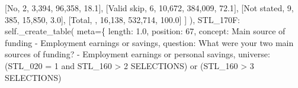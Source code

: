 \documentclass[
  11pt,
  a4paper,
]{article}
\newenvironment{Shaded}{\begin{snugshade}}{\end{snugshade}}
\newcommand{\NormalTok}[1]{\textcolor[rgb]{0.00,0.23,0.31}{#1}}
\newcommand{\OperatorTok}[1]{\textcolor[rgb]{0.37,0.37,0.37}{#1}}
\newcommand{\StringTok}[1]{\textcolor[rgb]{0.13,0.47,0.30}{#1}}
\newcommand{\VariableTok}[1]{\textcolor[rgb]{0.07,0.07,0.07}{#1}}
\begin{document}
\begin{Shaded}
\begin{Highlighting}[]
\NormalTok{                    [}\StringTok{\textquotesingle{}No\textquotesingle{}}\NormalTok{, }\StringTok{\textquotesingle{}2\textquotesingle{}}\NormalTok{, }\StringTok{\textquotesingle{}3,394\textquotesingle{}}\NormalTok{, }\StringTok{\textquotesingle{}96,358\textquotesingle{}}\NormalTok{, }\StringTok{\textquotesingle{}18.1\textquotesingle{}}\NormalTok{],}
\NormalTok{                    [}\StringTok{\textquotesingle{}Valid skip\textquotesingle{}}\NormalTok{, }\StringTok{\textquotesingle{}6\textquotesingle{}}\NormalTok{, }\StringTok{\textquotesingle{}10,672\textquotesingle{}}\NormalTok{, }\StringTok{\textquotesingle{}384,009\textquotesingle{}}\NormalTok{, }\StringTok{\textquotesingle{}72.1\textquotesingle{}}\NormalTok{],}
\NormalTok{                    [}\StringTok{\textquotesingle{}Not stated\textquotesingle{}}\NormalTok{, }\StringTok{\textquotesingle{}9\textquotesingle{}}\NormalTok{, }\StringTok{\textquotesingle{}385\textquotesingle{}}\NormalTok{, }\StringTok{\textquotesingle{}15,850\textquotesingle{}}\NormalTok{, }\StringTok{\textquotesingle{}3.0\textquotesingle{}}\NormalTok{],}
\NormalTok{                    [}\StringTok{\textquotesingle{}Total\textquotesingle{}}\NormalTok{, }\StringTok{\textquotesingle{}\textquotesingle{}}\NormalTok{, }\StringTok{\textquotesingle{}16,138\textquotesingle{}}\NormalTok{, }\StringTok{\textquotesingle{}532,714\textquotesingle{}}\NormalTok{, }\StringTok{\textquotesingle{}100.0\textquotesingle{}}\NormalTok{]}
\NormalTok{                ]}
\NormalTok{            ),}
            \StringTok{\textquotesingle{}STL\_170F\textquotesingle{}}\NormalTok{: }\VariableTok{self}\NormalTok{.\_create\_table(}
\NormalTok{                meta}\OperatorTok{=}\NormalTok{\{}
                    \StringTok{\textquotesingle{}length\textquotesingle{}}\NormalTok{: }\StringTok{\textquotesingle{}1.0\textquotesingle{}}\NormalTok{, }\StringTok{\textquotesingle{}position\textquotesingle{}}\NormalTok{: }\StringTok{\textquotesingle{}67\textquotesingle{}}\NormalTok{,}
                    \StringTok{\textquotesingle{}concept\textquotesingle{}}\NormalTok{: }\StringTok{\textquotesingle{}Main source of funding {-} Employment earnings or savings\textquotesingle{}}\NormalTok{,}
                    \StringTok{\textquotesingle{}question\textquotesingle{}}\NormalTok{: }\StringTok{\textquotesingle{}What were your two main sources of funding? {-} Employment earnings or personal savings\textquotesingle{}}\NormalTok{,}
                    \StringTok{\textquotesingle{}universe\textquotesingle{}}\NormalTok{: }\StringTok{\textquotesingle{}(STL\_020 = 1 and STL\_160 \textgreater{} 2 SELECTIONS) or (STL\_160 \textgreater{} 3 SELECTIONS)\textquotesingle{}}

\end{Highlighting}
\end{Shaded}
\end{document}
